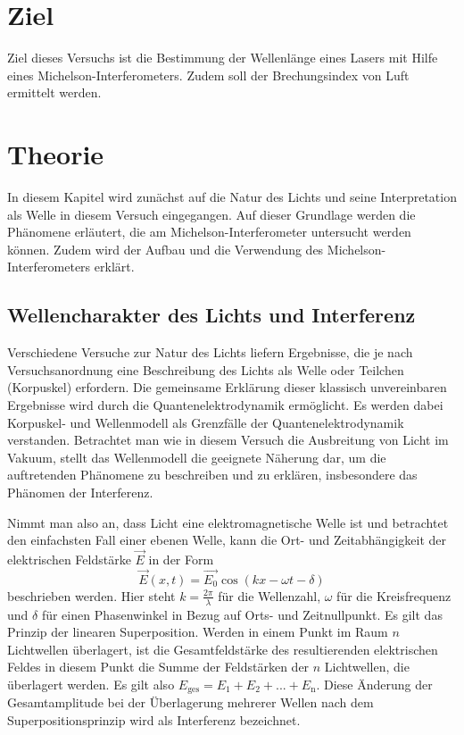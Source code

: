 \section{Ziel}
\label{sec:Ziel}

Ziel dieses Versuchs ist die Bestimmung der Wellenlänge eines Lasers mit Hilfe eines Michelson-Interferometers. 
Zudem soll der Brechungsindex von Luft ermittelt werden. 

\section{Theorie}
\label{sec:Theorie}

In diesem Kapitel wird zunächst auf die Natur des Lichts und seine Interpretation als Welle in diesem Versuch eingegangen.
Auf dieser Grundlage werden die Phänomene erläutert, die am Michelson-Interferometer untersucht werden können. 
Zudem wird der Aufbau und die Verwendung des Michelson-Interferometers erklärt. 
\subsection{Wellencharakter des Lichts und Interferenz}
\label{ssec:Interferenz}

Verschiedene Versuche zur Natur des Lichts liefern Ergebnisse, die je nach Versuchsanordnung eine Beschreibung des 
Lichts als Welle oder Teilchen (Korpuskel) erfordern. Die gemeinsame Erklärung dieser klassisch unvereinbaren Ergebnisse 
wird durch die Quantenelektrodynamik ermöglicht. Es werden dabei Korpuskel- und Wellenmodell als Grenzfälle
der Quantenelektrodynamik verstanden. Betrachtet man wie in diesem Versuch die Ausbreitung von Licht im Vakuum, stellt das 
Wellenmodell die geeignete Näherung dar, um die auftretenden Phänomene zu beschreiben und zu erklären, insbesondere 
das Phänomen der Interferenz. 

Nimmt man also an, dass Licht eine elektromagnetische Welle ist und betrachtet den einfachsten Fall einer ebenen Welle, 
kann die Ort- und Zeitabhängigkeit der elektrischen Feldstärke $\vec{E}$ in der Form
\begin{equation}
    \vec{E}(x,t) = \vec{E_0} \cos\left(kx - \omega t - \delta\right)
\label{eqn:wave}
\end{equation}
beschrieben werden. Hier steht $k = \frac{2\pi}{\lambda}$ für die Wellenzahl, $\omega$ für die Kreisfrequenz und 
$\delta$ für einen Phasenwinkel in Bezug auf Orts- und Zeitnullpunkt. Es gilt das Prinzip der linearen Superposition.
Werden in einem Punkt im Raum $n$ Lichtwellen überlagert, ist die Gesamtfeldstärke des resultierenden elektrischen Feldes 
in diesem Punkt die Summe der Feldstärken der $n$ Lichtwellen, die überlagert werden. Es gilt also 
$E_\text{ges} = E_1 + E_2 + ... + E_\text{n}$. Diese Änderung der Gesamtamplitude bei der Überlagerung mehrerer Wellen nach dem 
Superpositionsprinzip wird als Interferenz bezeichnet. 

